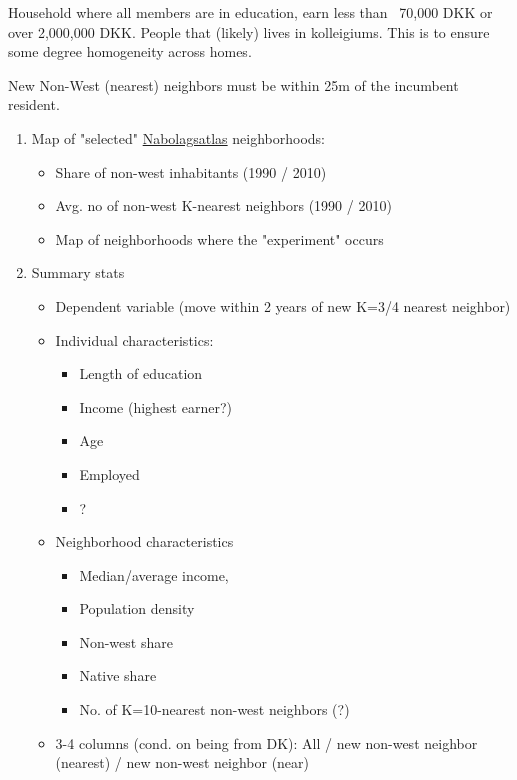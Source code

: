 \documentclass[main.tex]{subfiles}
\begin{document}
Household where all members are in education, earn less than ~70,000 DKK or over 2,000,000 DKK. People that (likely) lives in kolleigiums. This is to ensure some degree homogeneity across homes. 

New Non-West (nearest) neighbors must be within 25m of the incumbent resident. 

\begin{enumerate}
    \item Map of "selected" \href{nabolagstlas.dk}{Nabolagsatlas} neighborhoods:
    \begin{itemize}
        \item Share of non-west inhabitants (1990 / 2010)
        \item Avg. no of non-west K-nearest neighbors (1990 / 2010) 
        \item Map of neighborhoods where the "experiment" occurs
    \end{itemize}
    \item Summary stats
    \begin{itemize}
        \item Dependent variable (move within 2 years of new K=3/4 nearest neighbor)
        \item Individual characteristics:
        \begin{itemize}
            \item Length of education
            \item Income (highest earner?)
            \item Age
            \item Employed
            \item ?
        \end{itemize}
        \item Neighborhood characteristics
        \begin{itemize}
            \item Median/average income,
            \item Population density
            \item Non-west share
            \item Native share
            \item No. of K=10-nearest non-west neighbors (?)
        \end{itemize}
        \item 3-4 columns (cond. on being from DK): All / new non-west neighbor (nearest) / new non-west neighbor (near)
    \end{itemize}
\end{enumerate}
\end{document}
